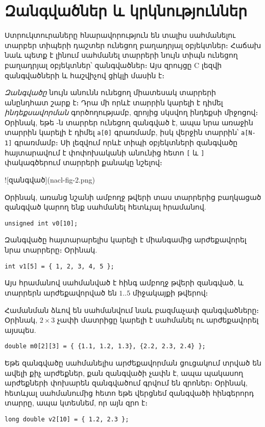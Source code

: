 \chapter{Զանգվածներ և կրկնություններ}

Ստրուկտուրաները հնարավորություն են տալիս սահմանելու տարբեր տիպերի դաշտեր
ունեցող բաղադրյալ օբյեկտներ։ Հաճախ նաև պետք է լինում սահմանել տարրերի նույն
տիպն ունեցող բաղադրյալ օբյեկտներ՝ զանգվածներ։ Այս զրույցը C լեզվի զանգվածների
և հաշվիչով ցիկլի մասին է։

\emph{Զանգվածը} նույն անունն ունեցող միատեսակ տարրերի անընդհատ շարք է։
Դրա մի որևէ տարրին կարելի է դիմել \emph{ինդեքսավորման} գործողությամբ,
զրոյից սկսվող ինդեքսի միջոցով։ Օրինակ, եթե -ն  տարրեր
ունեցող զանգված է, ապա նրա առաջին տարրին կարելի է դիմել \Verb|a[0]|
գրառմամբ, իսկ վերջին տարրին՝ \Verb|a[N-1]| գրառմամբ։ Սի լեզվում որևէ տիպի
օբյեկտների զանգվածը հայտարավում է փոփոխականի անունից հետո \Verb|[| և
\Verb|]| փակագծերում տարրերի քանակը նշելով։

![զանգված](nacl-fig-2.png)

Օրինակ, առանց նշանի ամբողջ թվերի տաս տարրերից բաղկացած զանգված կարող ենք
սահմանել հետևյալ հրամանով.

\begin{Verbatim}
unsigned int v0[10];
\end{Verbatim}

Զանգվածը հայտարարելիս կարելի է միանգամից արժեքավորել նրա տարրերը։ Օրինակ.

\begin{Verbatim}
int v1[5] = { 1, 2, 3, 4, 5 };
\end{Verbatim}

Այս հրամանով սահմանված է հինգ ամբողջ թվերի զանգված, և տարրերն արժեքավորված
են \(1..5\) միջակայքի թվերով։

Համանման ձևով են սահմանվում նաև բազմաչափ զանգվածները։ Օրինակ, \(2\times 3\)
չափի մատրիցը կարելի է սահմանել ու արժեքավորել այսպես.

\begin{Verbatim}
double m0[2][3] = { {1.1, 1.2, 1.3}, {2.2, 2.3, 2.4} };
\end{Verbatim}

Եթե զանգվածը սահմանելիս արժեքավորման ցուցակում տրված են ավելի քիչ արժեքներ,
քան զանգվածի չափն է, ապա պակասող արժեքների փոխարեն զանգվածում գրվում են
զրոներ։ Օրինակ, հետևյալ սահմանումից հետո եթե վերցնեմ  զանգվածի
հինգերորդ տարրը, ապա կտեսնեմ, որ այն զրո է։

\begin{Verbatim}
long double v2[10] = { 1.2, 2.3 };
\end{Verbatim}

